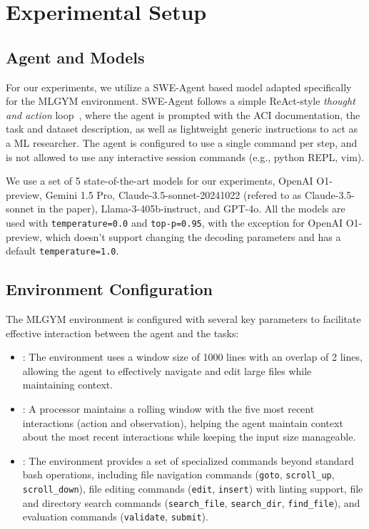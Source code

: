 \section{Experimental Setup}
\label{sec:experiment_setup}


\subsection{Agent and Models}
For our experiments, we utilize a SWE-Agent based model adapted specifically for the MLGYM environment.
%
SWE-Agent follows a simple ReAct-style \textit{thought and action} loop~\citep{yao2023react}, where the agent is prompted with the ACI documentation, the task and dataset description, as well as lightweight generic instructions to act as a ML researcher.
%
The agent is configured to use a single command per step, and is not allowed to use any interactive session commands (e.g., python REPL, vim).

We use a set of 5 state-of-the-art models for our experiments, OpenAI O1-preview, Gemini 1.5 Pro, Claude-3.5-sonnet-20241022 (refered to as Claude-3.5-sonnet in the paper), Llama-3-405b-instruct, and GPT-4o.
%
All the models are used with \texttt{temperature=0.0} and \texttt{top-p=0.95}, with the exception for OpenAI O1-preview, which doesn't support changing the decoding parameters and has a default \texttt{temperature=1.0}.

\subsection{Environment Configuration}
The MLGYM environment is configured with several key parameters to facilitate effective interaction between the agent and the tasks:

\begin{itemize}
    \item {}: The environment uses a window size of 1000 lines with an overlap of 2 lines, allowing the agent to effectively navigate and edit large files while maintaining context.

    \item {}: A processor maintains a rolling window with the five most recent interactions (action and observation), helping the agent maintain context about the most recent interactions while keeping the input size manageable.

    \item {}: The environment provides a set of specialized commands beyond standard bash operations, including file navigation commands (\texttt{goto}, \texttt{scroll\_up}, \texttt{scroll\_down}), file editing commands (\texttt{edit}, \texttt{insert}) with linting support,  file and directory search commands (\texttt{search\_file}, \texttt{search\_dir}, \texttt{find\_file}), and evaluation commands (\texttt{validate}, \texttt{submit}).
\end{itemize}

